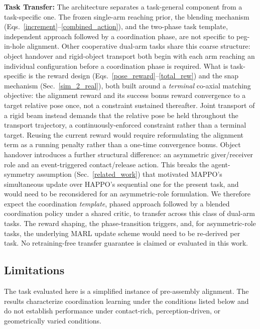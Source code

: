 \documentclass[a4paper,fleqn]{cas-dc}
\begin{document}
\noindent\textbf{Task Transfer:} The architecture separates a task-general component from a task-specific one. The frozen single-arm reaching prior, the blending mechanism (Eqs.~\ref{increment}--\ref{combined_action}), and the two-phase task template, independent approach followed by a coordination phase, are not specific to peg-in-hole alignment. Other cooperative dual-arm tasks share this coarse structure: object handover and rigid-object transport both begin with each arm reaching an individual configuration before a coordination phase is required. What is task-specific is the reward design (Eqs.~\ref{pose_reward}--\ref{total_rew}) and the snap mechanism (Sec.~\ref{sim_2_real}), both built around a \emph{terminal} co-axial matching objective: the alignment reward and its success bonus reward convergence to a target relative pose once, not a constraint sustained thereafter. Joint transport of a rigid beam instead demands that the relative pose be held throughout the transport trajectory, a continuously-enforced constraint rather than a terminal target. Reusing the current reward would require reformulating the alignment term as a running penalty rather than a one-time convergence bonus. Object handover introduces a further structural difference: an asymmetric giver/receiver role and an event-triggered contact/release action. This breaks the agent-symmetry assumption (Sec.~\ref{related_work}) that motivated MAPPO's simultaneous update over HAPPO's sequential one for the present task, and would need to be reconsidered for an asymmetric-role formulation. We therefore expect the coordination \emph{template}, phased approach followed by a blended coordination policy under a shared critic, to transfer across this class of dual-arm tasks. The reward shaping, the phase-transition triggers, and, for asymmetric-role tasks, the underlying MARL update scheme would need to be re-derived per task. No retraining-free transfer guarantee is claimed or evaluated in this work.

\subsection{Limitations}
\label{limitations}
The task evaluated here is a simplified instance of pre-assembly alignment. The results characterize coordination learning under the conditions listed below and do not establish performance under contact-rich, perception-driven, or geometrically varied conditions.
\end{document}

